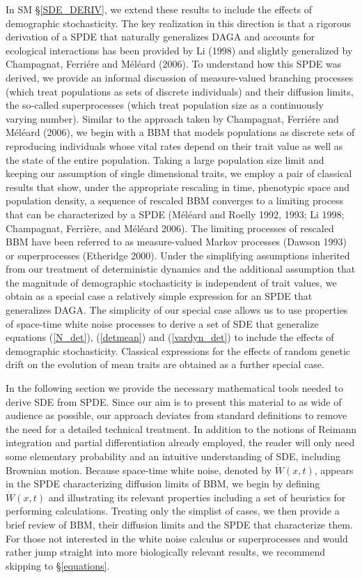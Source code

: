 \documentclass[]{article}
\begin{document}
In SM \S\ref{SDE_DERIV}, we extend these results to include the effects
of demographic stochasticity. The key realization in this direction is
that a rigorous derivation of a SPDE that naturally generalizes DAGA and
accounts for ecological interactions has been provided by Li (1998) and
slightly generalized by Champagnat, Ferriére and Méléard (2006). To
understand how this SPDE was derived, we provide an informal discussion
of measure-valued branching processes (which treat populations as sets
of discrete individuals) and their diffusion limits, the so-called
superprocesses (which treat population size as a continuously varying
number). Similar to the approach taken by Champagnat, Ferriére and
Méléard (2006), we begin with a BBM that models populations as discrete
sets of reproducing individuals whose vital rates depend on their trait
value as well as the state of the entire population. Taking a large
population size limit and keeping our assumption of single dimensional
traits, we employ a pair of classical results that show, under the
appropriate rescaling in time, phenotypic space and population density,
a sequence of rescaled BBM converges to a limiting process that can be
characterized by a SPDE (Méléard and Roelly 1992, 1993; Li 1998;
Champagnat, Ferrière, and Méléard 2006). The limiting processes of
rescaled BBM have been referred to as measure-valued Markov processes
(Dawson 1993) or superprocesses (Etheridge 2000). Under the simplifying
assumptions inherited from our treatment of deterministic dynamics and
the additional assumption that the magnitude of demographic
stochasticity is independent of trait values, we obtain as a special
case a relatively simple expression for an SPDE that generalizes DAGA.
The simplicity of our special case allows us to use properties of
space-time white noise processes to derive a set of SDE that generalize
equations (\ref{N_det}), (\ref{detmean}) and (\ref{vardyn_det}) to
include the effects of demographic stochasticity. Classical expressions
for the effects of random genetic drift on the evolution of mean traits
are obtained as a further special case.

In the following section we provide the necessary mathematical tools
needed to derive SDE from SPDE. Since our aim is to present this
material to as wide of audience as possible, our approach deviates from
standard definitions to remove the need for a detailed technical
treatment. In addition to the notions of Reimann integration and partial
differentiation already employed, the reader will only need some
elementary probability and an intuitive understanding of SDE, including
Brownian motion. Because space-time white noise, denoted by
\(\dot W(x,t)\), appears in the SPDE characterizing diffusion limits of
BBM, we begin by defining \(\dot W(x,t)\) and illustrating its relevant
properties including a set of heuristics for performing calculations.
Treating only the simplist of cases, we then provide a brief review of
BBM, their diffusion limits and the SPDE that characterize them. For
those not interested in the white noise calculus or superprocesses and
would rather jump straight into more biologically relevant results, we
recommend skipping to \S\ref{equations}.
\end{document}
